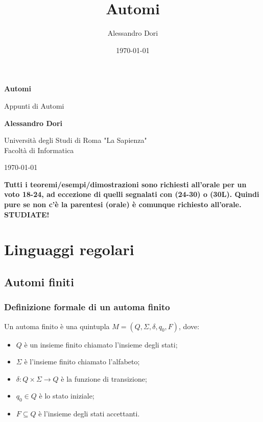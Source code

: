 \documentclass{article}
\title{Automi}
\author{Alessandro Dori}
\date{\today}
\begin{document}
\begin{titlepage}
    \centering
    \vspace*{1cm}
    
    \Huge
    \textbf{Automi}
    
    \vspace{0.5cm}
    \LARGE
    Appunti di Automi
    
    \vspace{1.5cm}
    
    \textbf{Alessandro Dori}
    
    \Large
    Università degli Studi di Roma "La Sapienza"\\
    Facoltà di Informatica
    
    \vspace{0.8cm}
    
    \today

    \vspace{3cm}

    \begin{tcolorbox}[colback=red!10!white, colframe=red!50!black, title=ATTENZIONE!]
        \textbf{Tutti i teoremi/esempi/dimostrazioni sono richiesti all'orale per un voto 18-24, ad eccezione di quelli segnalati con (24-30) o (30L). Quindi pure se non c'è la parentesi (orale) è comunque richiesto all'orale. STUDIATE!}
    \end{tcolorbox}
    
\end{titlepage}

\tableofcontents
\newpage

\section{Linguaggi regolari}
\subsection{Automi finiti}

\subsubsection*{Definizione formale di un automa finito}
Un automa finito è una quintupla $M = (Q, \Sigma, \delta, q_0, F)$, dove:
\begin{itemize}
    \item $Q$ è un insieme finito chiamato l'insieme degli stati;
    \item $\Sigma$ è l'insieme finito chiamato l'alfabeto;
    \item $\delta: Q \times \Sigma \rightarrow Q$ è la funzione di transizione;
    \item $q_0 \in Q$ è lo stato iniziale;
    \item $F \subseteq Q$ è l'insieme degli stati accettanti.
\end{itemize}
\end{document}
